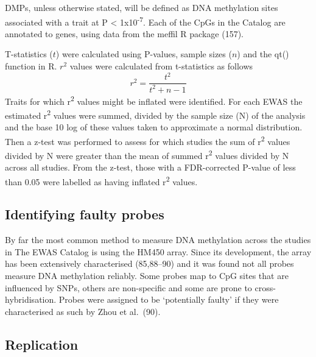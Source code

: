 \documentclass[11pt,oneside]{bristolthesis}
\begin{document}
DMPs, unless otherwise stated, will be defined as DNA methylation sites associated with a trait at P \textless{} 1x10\textsuperscript{-7}. Each of the CpGs in the Catalog are annotated to genes, using data from the meffil R package (157).

T-statistics (\(t\)) were calculated using P-values, sample sizes (\(n\)) and the qt() function in R. \(r^2\) values were calculated from t-statistics as follows
\begin{equation}
    r^2 = \frac{t^2} {t^2 + n - 1}
    \label{eq:r-squared}
\end{equation}
Traits for which r\textsuperscript{2} values might be inflated were identified. For each EWAS the estimated r\textsuperscript{2} values were summed, divided by the sample size (N) of the analysis and the base 10 log of these values taken to approximate a normal distribution. Then a z-test was performed to assess for which studies the sum of r\textsuperscript{2} values divided by N were greater than the mean of summed r\textsuperscript{2} values divided by N across all studies. From the z-test, those with a FDR-corrected P-value of less than 0.05 were labelled as having inflated r\textsuperscript{2} values.

\hypertarget{identifying-faulty-probes}{%
\subsection{Identifying faulty probes}\label{identifying-faulty-probes}}

By far the most common method to measure DNA methylation across the studies in The EWAS Catalog is using the HM450 array. Since its development, the array has been extensively characterised (85,88--90) and it was found not all probes measure DNA methylation reliably. Some probes map to CpG sites that are influenced by SNPs, others are non-specific and some are prone to cross-hybridisation. Probes were assigned to be `potentially faulty' if they were characterised as such by Zhou et al.~(90).

\hypertarget{replication-methods-04}{%
\subsection{Replication}\label{replication-methods-04}}
\end{document}
